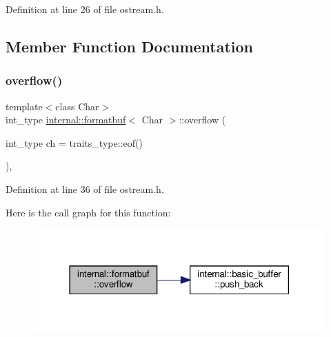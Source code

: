 Definition at line 26 of file ostream.\+h.



\subsection{Member Function Documentation}
\mbox{\label{classinternal_1_1formatbuf_a8bd06d6e45ceeb2e89956359e47aa9b7}} 
\subsubsection{\texorpdfstring{overflow()}{overflow()}}
{\footnotesize\ttfamily template$<$class Char$>$ \\
int\+\_\+type \hyperlink{classinternal_1_1formatbuf}{internal\+::formatbuf}$<$ Char $>$\+::overflow (\begin{DoxyParamCaption}\item[{int\+\_\+type}]{ch = {\ttfamily traits\+\_\+type\+:\+:eof()} }\end{DoxyParamCaption})\hspace{0.3cm}{\ttfamily [inline]}, {\ttfamily [protected]}}



Definition at line 36 of file ostream.\+h.

Here is the call graph for this function\+:
\nopagebreak
\begin{figure}[H]
\begin{center}
\leavevmode
\includegraphics[width=318pt]{classinternal_1_1formatbuf_a8bd06d6e45ceeb2e89956359e47aa9b7_cgraph}
\end{center}
\end{figure}
\mbox{\label{classinternal_1_1formatbuf_a59b8ab9a4c9907e4d6bae3861832e687}} 
